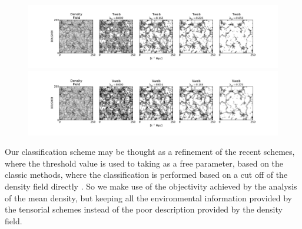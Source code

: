 \documentclass[a4,useAMS,usenatbib,usegraphicx]{latex/mn2e}
\begin{document}
\begin{flushleft}
\begin{figure}
\begin{center}

  \includegraphics[trim = 42mm 15mm 37mm 10mm, clip, keepaspectratio=true,
  width=0.75\textheight]{./figures/cosmicweb_visual_Tweb.pdf}
  \includegraphics[trim = 42mm 15mm 37mm 10mm, clip, keepaspectratio=true,
  width=0.75\textheight]{./figures/cosmicweb_visual_Vweb.pdf}


  \label{fig:visual_impression}
  \vspace{0.1 cm}

\end{center}
\end{figure}
\end{flushleft}



Our classification scheme may be thought as a refinement of the recent 
schemes, where the threshold value is used to taking as a free parameter, 
based on the classic methods, where the classification is performed 
based on a cut off of the density field directly .
So we make use of the objectivity achieved by the analysis of the mean 
density, but keeping all the environmental information provided by the
tensorial schemes instead of the poor description provided by the density 
field.
\end{document}
